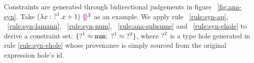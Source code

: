

\par
Constraints are generated through bidirectional judgements in figure ~\ref{fig:ana-syn}. Take $(\lambda x:\mathtt{?}^{1}. x+1)~ \textcolor{violet}{\llparenthesis}\textcolor{violet}{\rrparenthesis}^2$ as an example. We apply rule ~\ref{rule:syn-ap}, ~\ref{rule:syn-lamann}, ~\ref{rule:syn-num}, ~\ref{rule:ana-subsume} and ~\ref{rule:syn-ehole} to derive a constraint set: $\{\mathtt{?}^{1} \approx \mathtt{num};~ \mathtt{?}^{1} \approx \mathtt{?}^{2}\}$, where $\mathtt{?}^{2}$ is a type hole generated in rule \ref{rule:syn-ehole} whose provenance is simply sourced from the original expression hole's id. 


